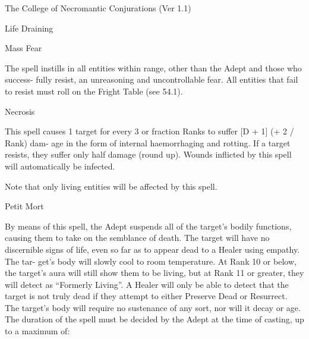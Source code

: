 \begin{Chapter}{The College of Necromantic Conjurations (Ver 1.1)}
\begin{spell}[S-7]{Life Draining }
\begin{effects}
\end{effects}
\end{spell}

\begin{spell}[S-8]{Mass Fear }

\begin{effects}
 The  spell  instills  in  all  entities  within 
range, other than the Adept and those who success-
fully resist, an unreasoning and uncontrollable fear. 
All entities that fail to resist must roll on the Fright 
Table (see 54.1). 

\end{effects}
\end{spell}

\begin{spell}[S-9]{Necrosis }


\begin{effects}
 This  spell  causes  1  target  for  every  3  or 
fraction Ranks to suffer [D + 1] (+ 2 / Rank) dam-
age  in  the  form  of  internal  haemorrhaging  and 
rotting.  If  a  target  resists,  they  suffer  only  half 
damage (round up). Wounds inflicted by this spell 
will automatically be infected. 

Note  that  only  living  entities  will  be  affected  by 
this spell. 

\end{effects}
\end{spell}

\begin{spell}[S-10]{Petit Mort }

\begin{effects}
By means of this spell, the Adept suspends 
all of the target’s bodily functions, causing them to 
take  on  the  semblance  of  death.  The  target  will 
have  no  discernible  signs  of  life,  even  so  far  as  to 
appear  dead  to  a  Healer  using  empathy.  The  tar-
get’s  body  will  slowly  cool  to  room  temperature. 
At  Rank  10  or  below,  the  target’s  aura  will  still 
show them to be living, but at Rank 11 or greater, 
they  will  detect  as  “Formerly  Living”.  A  Healer 
will  only  be  able  to  detect  that  the  target  is  not 
truly  dead  if  they  attempt  to  either  Preserve  Dead 
or  Resurrect.  The  target’s  body  will  require  no 
sustenance of any sort, nor will it decay or age. The 
duration of the spell must be decided by the Adept 
at the time of casting, up to a maximum of: 


\end{effects}
\end{spell}
\end{Chapter}
